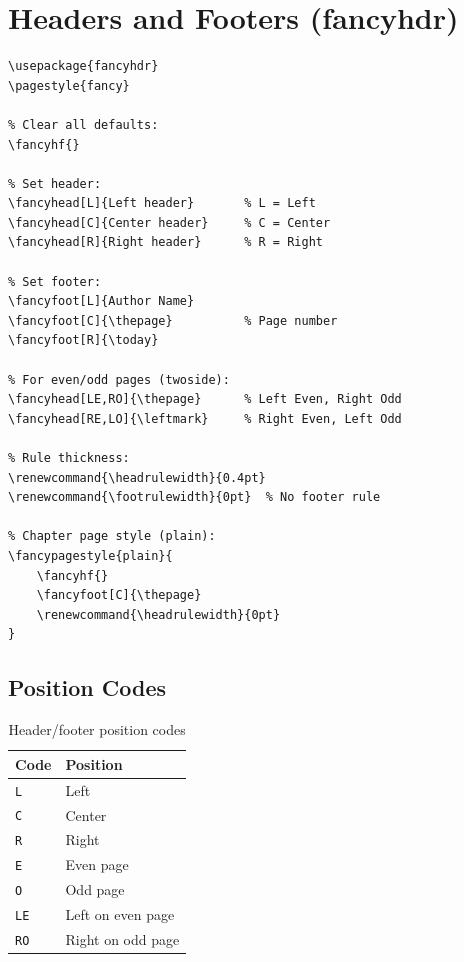 \section{Headers and Footers (fancyhdr)}

\begin{lstlisting}[language={[LaTeX]TeX}, caption=fancyhdr package]
\usepackage{fancyhdr}
\pagestyle{fancy}

% Clear all defaults:
\fancyhf{}

% Set header:
\fancyhead[L]{Left header}       % L = Left
\fancyhead[C]{Center header}     % C = Center
\fancyhead[R]{Right header}      % R = Right

% Set footer:
\fancyfoot[L]{Author Name}
\fancyfoot[C]{\thepage}          % Page number
\fancyfoot[R]{\today}

% For even/odd pages (twoside):
\fancyhead[LE,RO]{\thepage}      % Left Even, Right Odd
\fancyhead[RE,LO]{\leftmark}     % Right Even, Left Odd

% Rule thickness:
\renewcommand{\headrulewidth}{0.4pt}
\renewcommand{\footrulewidth}{0pt}  % No footer rule

% Chapter page style (plain):
\fancypagestyle{plain}{
    \fancyhf{}
    \fancyfoot[C]{\thepage}
    \renewcommand{\headrulewidth}{0pt}
}
\end{lstlisting}

\subsection{Position Codes}

\begin{table}[H]
\centering
\begin{tabular}{ll}
\toprule
\textbf{Code} & \textbf{Position} \\
\midrule
\texttt{L} & Left \\
\texttt{C} & Center \\
\texttt{R} & Right \\
\texttt{E} & Even page \\
\texttt{O} & Odd page \\
\texttt{LE} & Left on even page \\
\texttt{RO} & Right on odd page \\
\bottomrule
\end{tabular}
\caption{Header/footer position codes}
\end{table}

